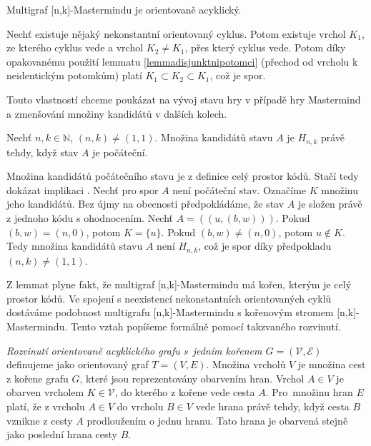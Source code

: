 \begin{lemma}
    Multigraf [n,k]-Mastermindu je orientovaně acyklický. 
\end{lemma}
\begin{dukaz}
    Nechť existuje nějaký nekonstantní orientovaný cyklus. Potom existuje vrchol $K_1$, ze kterého cyklus vede a vrchol $K_2 \neq K_1$, přes který cyklus vede. Potom díky opakovanému použití lemmatu \ref{lemmadisjunktnipotomci} (přechod od vrcholu k neidentickým potomkům) platí $K_1 \subset K_2 \subset K_1$, což je spor. 
\end{dukaz}
Touto vlastností chceme poukázat na vývoj stavu hry v případě hry Mastermind a zmenšování množiny kandidátů v dalších kolech. 

\begin{lemma}\label{lemmakandidatipocstavu}
    Nechť $n,k\in \mathbb{N}$, $(n,k) \neq (1,1)$. Množina kandidátů stavu $A$ je $H_{n,k}$ právě tehdy, když stav $A$ je počáteční.
\end{lemma}
\begin{dukaz}
    Množina kandidátů počátečního stavu je z definice celý prostor kódů. Stačí tedy dokázat implikaci \uv{\Rightarrow}. Nechť pro spor $A$ není počáteční stav. Označíme $K$ množinu jeho kandidátů. Bez újmy na obecnosti předpokládáme, že stav $A$ je složen právě z jednoho kódu s ohodnocením. Nechť $A = ((u, (b,w)))$. Pokud $(b,w) = (n,0)$, potom $K = \{u\}$. Pokud $(b,w) \neq (n,0)$, potom $u \notin K$. Tedy množina kandidátů stavu $A$ není $H_{n,k}$, což je spor díky předpokladu $(n,k) \neq (1,1)$.
\end{dukaz}

Z lemmat plyne fakt, že multigraf [n,k]-Mastermindu má kořen, kterým je celý prostor kódů. Ve spojení s neexistencí nekonstantních orientovaných cyklů dostáváme podobnost multigrafu [n,k]-Mastermindu s kořenovým stromem [n,k]-Mastermindu. Tento vztah popíšeme formálně pomocí takzvaného rozvinutí.
\begin{definice}
    \emph{Rozvinutí orientovaně acyklického grafu s~jedním kořenem $G = (\mathcal{V}, \mathcal{E})$} definujeme jako orientovaný graf $T = (V, E)$.
    Množina vrcholů $V$ je množina cest z kořene grafu $G$, které jsou reprezentovány obarvením hran. Vrchol $A \in V$ je obarven vrcholem $K \in \mathcal{V}$, do kterého z kořene vede cesta $A$. 
    Pro~množinu hran $E$ platí, že z vrcholu $A \in V$ do vrcholu $B \in V$ vede hrana právě tehdy, když cesta $B$ vznikne z cesty $A$ prodloužením o jednu hranu. Tato hrana je obarvená stejně jako poslední hrana cesty $B$. 
\end{definice}

